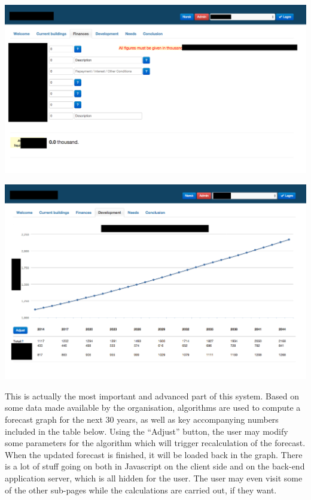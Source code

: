 \documentclass[11pt]{article}
\begin{document}
\vspace{2\baselineskip}
\noindent
\includegraphics[width=\textwidth]{portfolio-graphics/GH-2.png}    

\vspace{2\baselineskip}
\noindent
\includegraphics[width=\textwidth]{portfolio-graphics/GH-3.png}    

\vspace{\baselineskip}
\noindent
This is actually the most important and advanced part of this system. Based on some data made available by the organisation, algorithms are used to compute a forecast graph for the next 30 years, as well as key accompanying numbers included in the table below. Using the ``Adjust'' button, the user may modify some parameters for the algorithm which will trigger recalculation of the forecast. When the updated forecast is finished, it will be loaded back in the graph. There is a lot of stuff going on both in Javascript on the client side and on the back-end application server, which is all hidden for the user. The user may even visit some of the other sub-pages while the calculations are carried out, if they want.
\end{document}

